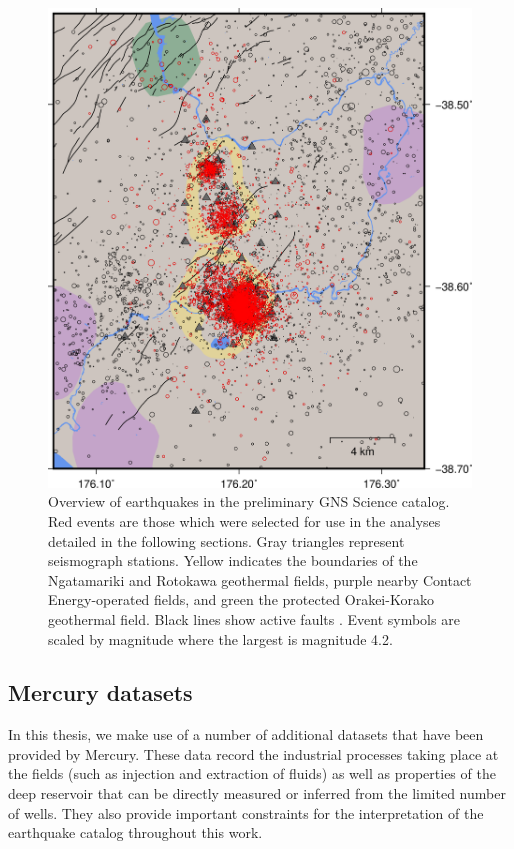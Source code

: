 \begin{figure}[h!]
\begin{center}
\includegraphics[width=0.70\columnwidth]{Chapter_2_Data/figures/RotNga_catalog_overview/RotNga_catalog_overview}
\caption[GNS template event locations]{{
Overview of earthquakes in the preliminary GNS Science catalog. Red
events are those which were selected for use in the analyses detailed in
the following sections. Gray triangles represent seismograph stations.
Yellow indicates the boundaries of the Ngatamariki and Rotokawa
geothermal fields, purple nearby Contact Energy-operated fields, and
green the protected Orakei-Korako geothermal field. Black lines show
active faults \citep{AFDB}. Event symbols are scaled by magnitude where the largest
is magnitude 4.2.
{\label{955268}}%
}}
\end{center}
\end{figure}

\subsection{Mercury datasets}
In this thesis, we make use of a number of additional datasets that have been provided by Mercury. These data record the industrial processes taking place at the fields (such as injection and extraction of fluids) as well as properties of the deep reservoir that can be directly measured or inferred from the limited number of wells. They also provide important constraints for the interpretation of the earthquake catalog throughout this work.

